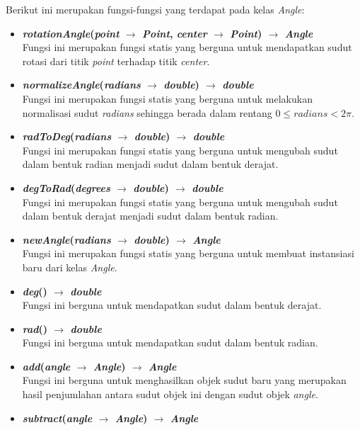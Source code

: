 Berikut ini merupakan fungsi-fungsi yang terdapat pada kelas \textit{Angle}:
\begin{itemize}
	\item \textbf{\textit{rotationAngle}(\textit{point} \(\rightarrow\) \textit{Point}, \textit{center} \(\rightarrow\) \textit{Point}) \(\rightarrow\) \textit{Angle}}\\
	Fungsi ini merupakan fungsi statis yang berguna untuk mendapatkan sudut rotasi dari titik \textit{point} terhadap titik \textit{center}.
	\item \textbf{\textit{normalizeAngle}(\textit{radians} \(\rightarrow\) \textit{double}) \(\rightarrow\) \textit{double}}\\
	Fungsi ini merupakan fungsi statis yang berguna untuk melakukan normalisasi sudut \textit{radians} sehingga berada dalam rentang \(0\leq\textit{radians}<2\pi\).
	\item \textbf{\textit{radToDeg}(\textit{radians} \(\rightarrow\) \textit{double}) \(\rightarrow\) \textit{double}}\\
	Fungsi ini merupakan fungsi statis yang berguna untuk mengubah sudut dalam bentuk radian menjadi sudut dalam bentuk derajat.
	\item \textbf{\textit{degToRad}(\textit{degrees} \(\rightarrow\) \textit{double}) \(\rightarrow\) \textit{double}}\\
	Fungsi ini merupakan fungsi statis yang berguna untuk mengubah sudut dalam bentuk derajat menjadi sudut dalam bentuk radian.
	\item \textbf{\textit{newAngle}(\textit{radians} \(\rightarrow\) \textit{double}) \(\rightarrow\) \textit{Angle}}\\
	Fungsi ini merupakan fungsi statis yang berguna untuk membuat instansiasi baru dari kelas \textit{Angle}.
	\item \textbf{\textit{deg}() \(\rightarrow\) \textit{double}}\\
	Fungsi ini berguna untuk mendapatkan sudut dalam bentuk derajat.
	\item \textbf{\textit{rad}() \(\rightarrow\) \textit{double}}\\
	Fungsi ini berguna untuk mendapatkan sudut dalam bentuk radian.
	\item \textbf{\textit{add}(\textit{angle} \(\rightarrow\) \textit{Angle}) \(\rightarrow\) \textit{Angle}}\\
	Fungsi ini berguna untuk menghasilkan objek sudut baru yang merupakan hasil penjumlahan antara sudut objek ini dengan sudut objek \textit{angle}.
	\item \textbf{\textit{subtract}(\textit{angle} \(\rightarrow\) \textit{Angle}) \(\rightarrow\) \textit{Angle}}\\

\end{itemize}
